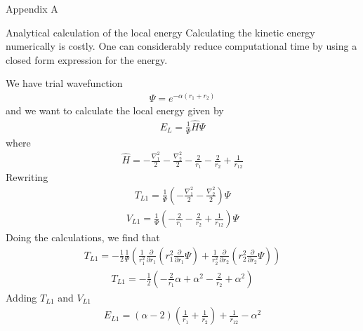 \documentclass[a4paper, 12pt, titlepage]{article}
\begin{document}
\newpage









\appendix
\begin{section}{Appendix A}

\begin{subsection}{Analytical calculation of the local energy}
 Calculating the kinetic energy numerically is costly. One can considerably reduce computational time by using a closed form expression for the energy. 

 We have trial wavefunction 
 \begin{align*}
 	\Psi = e^{-\alpha(r_1 + r_2)}
 \end{align*}
 and we want to calculate the local energy given by
 \begin{align*}
 	E_L = \frac{1}{\Psi} \hat H \Psi
 \end{align*}
 where
 \begin{align*}
 	\hat H = -\frac{\nabla_1^2}{2} - \frac{\nabla_2^2}{2} - \frac{2}{r_1} - \frac{2}{r_2} + \frac{1}{r_{12}}
 \end{align*}
 Rewriting	
 \begin{align*}
 	T_{L1} = \frac{1}{\Psi} \left( -\frac{\nabla_1^2}{2} - \frac{\nabla_2^2}{2} \right) \Psi
 \end{align*}
 \begin{align*}
 	V_{L1} = \frac{1}{\Psi} \left( - \frac{2}{r_1} - \frac{2}{r_2} + \frac{1}{r_{12}} \right) \Psi
 \end{align*}
 Doing the calculations, we find that
 \begin{align*}
 	T_{L1} = -\frac{1}{2} \frac{1}{\Psi} \left( \frac{1}{r_1^2} \frac{\partial}{\partial r_1} \left( r_1^2 \frac{\partial}{\partial r_1} \Psi \right) + \frac{1}{r_2^2} \frac{\partial}{\partial r_2} \left( r_2^2 \frac{\partial}{\partial r_2} \Psi \right) \right)
 \end{align*}
 \begin{align*}
 	T_{L1} = -\frac{1}{2} \left( -\frac{2}{r_1}\alpha + \alpha^2 - \frac{2}{r_2} + \alpha^2 \right)
 \end{align*}
 Adding $T_{L1}$ and $V_{L1}$ 
 \begin{align*}
 	E_{L1} = \left( \alpha - 2 \right) \left( \frac{1}{r_1} + \frac{1}{r_2} \right) + \frac{1}{r_{12}} - \alpha^2 
 \end{align*}


\end{subsection}
\end{section}
\end{document}
